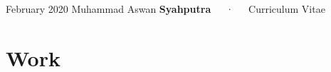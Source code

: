 \documentclass[11pt, a4paper]{awesome-cv}
\begin{document}
\makecvheader

\makecvfooter
  {February 2020}
    {Muhammad Aswan \textbf{Syahputra}~~~·~~~Curriculum Vitae}
  {\thepage}





\hypertarget{work}{%
\section{Work}\label{work}}
\end{document}
